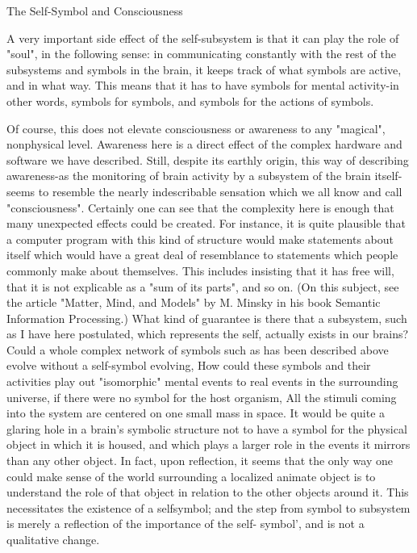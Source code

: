 The Self-Symbol and Consciousness

A very important side effect of the self-subsystem is that it can play the role of "soul", in
the following sense: in communicating constantly with the rest of the subsystems and
symbols in the brain, it keeps track of what symbols are active, and in what way. This
means that it has to have symbols for mental activity-in other words, symbols for
symbols, and symbols for the
actions of symbols.





        Of course, this does not elevate consciousness or awareness to any "magical",
nonphysical level. Awareness here is a direct effect of the complex hardware and
software we have described. Still, despite its earthly origin, this way of describing
awareness-as the monitoring of brain activity by a subsystem of the brain itself-seems to
resemble the nearly indescribable sensation which we all know and call "consciousness".
Certainly one can see that the complexity here is enough that many unexpected effects
could be created. For instance, it is quite plausible that a computer program with this kind
of structure would make statements about itself which would have a great deal of
resemblance to statements which people commonly make about themselves. This
includes insisting that it has free will, that it is not explicable as a "sum of its parts", and
so on. (On this subject, see the article "Matter, Mind, and Models" by M. Minsky in his
book Semantic Information Processing.)
        What kind of guarantee is there that a subsystem, such as I have here postulated,
which represents the self, actually exists in our brains? Could a whole complex network
of symbols such as has been described above evolve without a self-symbol evolving,
How could these symbols and their activities play out "isomorphic" mental events to real
events in the surrounding universe, if there were no symbol for the host organism, All the
stimuli coming into the system are centered on one small mass in space. It would be quite
a glaring hole in a brain's symbolic structure not to have a symbol for the physical object
in which it is housed, and which plays a larger role in the events it mirrors than any other
object. In fact, upon reflection, it seems that the only way one could make sense of the
world surrounding a localized animate object is to understand the role of that object in
relation to the other objects around it. This necessitates the existence of a selfsymbol; and
the step from symbol to subsystem is merely a reflection of the importance of the self-
symbol', and is not a qualitative change.

